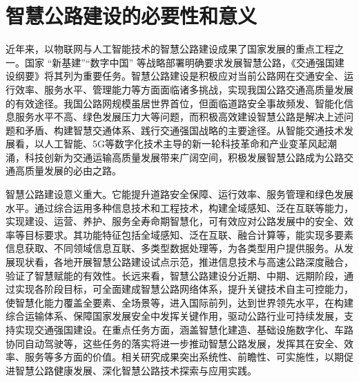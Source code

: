 \documentclass[12pt,hyperref,a4paper,UTF8]{ctexart}
\begin{document}
\begin{sloppypar}

\cover

%
%

\thispagestyle{empty} %

\newpage
\tableofcontents

\newpage


\section{智慧公路建设的必要性和意义}

近年来，以物联网与人工智能技术的智慧公路建设成果了国家发展的重点工程之一。国家 “新基建”“数字中国” 等战略部署明确要求发展智慧公路，《交通强国建设纲要》将其列为重要任务。智慧公路建设是积极应对当前公路网在交通安全、运行效率、服务水平、管理能力等方面面临诸多挑战，实现我国公路交通高质量发展的有效途径。我国公路网规模虽居世界首位，但面临道路安全事故频发、智能化信息服务水平不高、绿色发展压力大等问题，而积极高效建设智慧公路是解决上述问题和矛盾、构建智慧交通体系、践行交通强国战略的主要途径。从智能交通技术发展看，以人工智能、5G等数字化技术主导的新一轮科技革命和产业变革风起潮涌，科技创新为交通运输高质量发展带来广阔空间，积极发展智慧公路成为公路交通高质量发展的必由之路。

智慧公路建设意义重大。它能提升道路安全保障、运行效率、服务管理和绿色发展水平。通过综合运用多种信息技术和工程技术，构建全域感知、泛在互联等能力，实现建设、运营、养护、服务全寿命期智慧化，可有效应对公路发展中的安全、效率等目标要求。其功能特征包括全域感知、泛在互联、融合计算等，能实现多要素信息获取、不同领域信息互联、多类型数据处理等，为各类型用户提供服务。从发展现状看，各地开展智慧公路建设试点示范，推进信息技术与高速公路深度融合，验证了智慧赋能的有效性。长远来看，智慧公路建设分近期、中期、远期阶段，通过实现各阶段目标，可全面建成智慧公路网络体系，提升关键技术自主可控能力，使智慧化能力覆盖全要素、全场景等，进入国际前列，达到世界领先水平，在构建综合运输体系、保障国家发展安全中发挥关键作用，驱动公路行业可持续发展，支持实现交通强国建设。在重点任务方面，涵盖智慧化建造、基础设施数字化、车路协同自动驾驶等，这些任务的落实将进一步推动智慧公路发展，发挥其在安全、效率、服务等多方面的价值。相关研究成果突出系统性、前瞻性、可实施性，以期促进智慧公路健康发展、深化智慧公路技术探索与应用实践。


\end{sloppypar}
\end{document}
